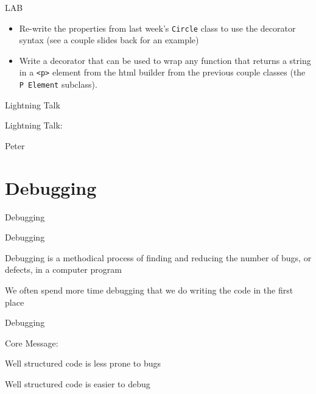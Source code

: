 \documentclass{beamer}
\begin{document}
\begin{frame}[fragile]{LAB}

\begin{itemize}
  \item Re-write the properties from last week's \verb|Circle| class to use the
        decorator syntax (see a couple slides back for an example)

  \item Write a decorator that can be used to wrap any function that returns a
        string in a \verb|<p>| element from the html builder from the previous
        couple classes (the \verb|P Element| subclass).
\end{itemize}

\end{frame}

\begin{frame}{Lightning Talk}

{\centering

\vfill
{\LARGE Lightning Talk:  }

\vfill
{\Huge Peter}

\vfill
}
\end{frame}


\section{Debugging}

\begin{frame}[fragile]{Debugging}

{\LARGE Debugging}

\vfill
{\Large Debugging is a methodical process of finding and reducing the number
of bugs, or defects, in a computer program}

\vfill
{\Large We often spend more time debugging that we do writing the code in the
first place}

\end{frame} 

\begin{frame}[fragile]{Debugging}

{\LARGE Core Message:}

\vfill
{\Large Well structured code is less prone to bugs}

\vfill
{\Large Well structured code is easier to debug}


\end{frame} 
\end{document}
